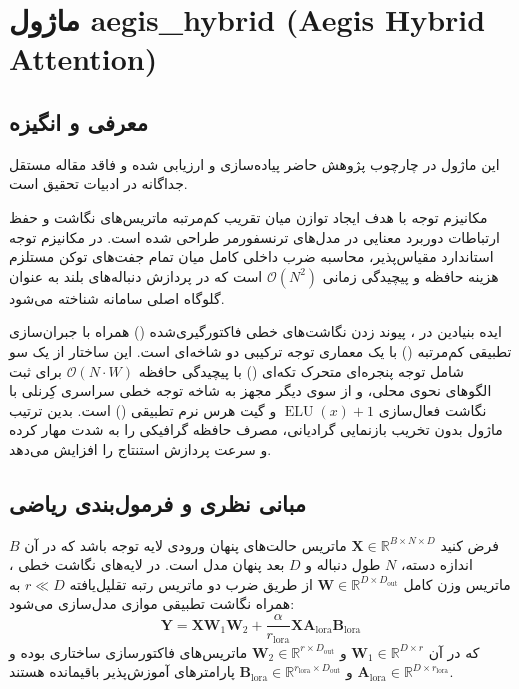 \section{ماژول aegis\_hybrid (Aegis Hybrid Attention)}
\label{sec:module_aegis_hybrid}

\subsection{معرفی و انگیزه}
این ماژول در چارچوب پژوهش حاضر پیاده‌سازی و ارزیابی شده و فاقد مقاله مستقل جداگانه در ادبیات تحقیق است.

مکانیزم توجه  با هدف ایجاد توازن میان تقریب کم‌مرتبه ماتریس‌های نگاشت و حفظ ارتباطات دوربرد معنایی در مدل‌های ترنسفورمر طراحی شده است. در مکانیزم توجه استاندارد مقیاس‌پذیر، محاسبه ضرب داخلی کامل میان تمام جفت‌های توکن مستلزم هزینه حافظه و پیچیدگی زمانی $\mathcal{O}(N^2)$ است که در پردازش دنباله‌های بلند به عنوان گلوگاه اصلی سامانه شناخته می‌شود.

ایده بنیادین در ، پیوند زدن نگاشت‌های خطی فاکتورگیری‌شده () همراه با جبران‌سازی تطبیقی کم‌مرتبه () با یک معماری توجه ترکیبی دو شاخه‌ای است. این ساختار از یک سو شامل توجه پنجره‌ای متحرک تکه‌ای () با پیچیدگی حافظه $\mathcal{O}(N \cdot W)$ برای ثبت الگوهای نحوی محلی، و از سوی دیگر مجهز به شاخه توجه خطی سراسری کِرنلی با نگاشت فعال‌سازی $\operatorname{ELU}(x) + 1$ و گیت هرس نرم تطبیقی () است. بدین ترتیب ماژول بدون تخریب بازنمایی گرادیانی، مصرف حافظه گرافیکی را به شدت مهار کرده و سرعت پردازش استنتاج را افزایش می‌دهد.

\subsection{مبانی نظری و فرمول‌بندی ریاضی}
فرض کنید $\mathbf{X} \in \mathbb{R}^{B \times N \times D}$ ماتریس حالت‌های پنهان ورودی لایه توجه باشد که در آن $B$ اندازه دسته، $N$ طول دنباله و $D$ بعد پنهان مدل است. در لایه‌های نگاشت خطی ، ماتریس وزن کامل $\mathbf{W} \in \mathbb{R}^{D \times D_{\text{out}}}$ از طریق ضرب دو ماتریس رتبه تقلیل‌یافته $r \ll D$ به همراه نگاشت تطبیقی موازی مدل‌سازی می‌شود:
\begin{equation}
\mathbf{Y} = \mathbf{X} \mathbf{W}_1 \mathbf{W}_2 + \frac{\alpha}{r_{\text{lora}}} \mathbf{X} \mathbf{A}_{\text{lora}} \mathbf{B}_{\text{lora}}
\end{equation}
که در آن $\mathbf{W}_1 \in \mathbb{R}^{D \times r}$ و $\mathbf{W}_2 \in \mathbb{R}^{r \times D_{\text{out}}}$ ماتریس‌های فاکتورسازی ساختاری بوده و $\mathbf{A}_{\text{lora}} \in \mathbb{R}^{D \times r_{\text{lora}}}$ و $\mathbf{B}_{\text{lora}} \in \mathbb{R}^{r_{\text{lora}} \times D_{\text{out}}}$ پارامترهای آموزش‌پذیر باقیمانده هستند.

